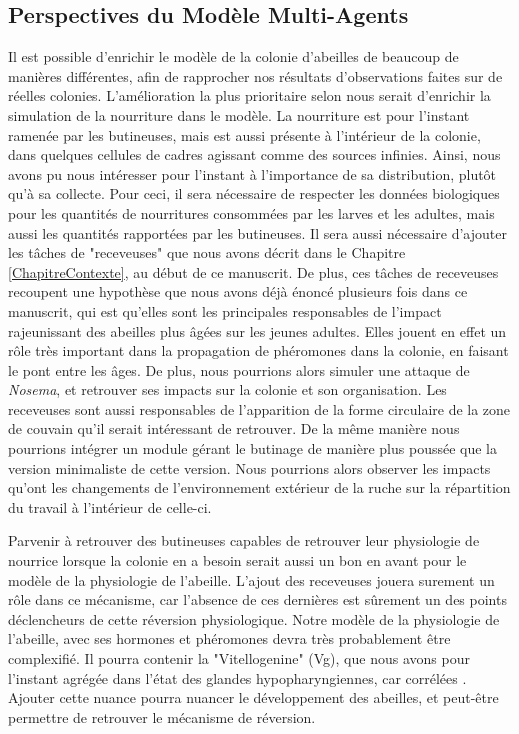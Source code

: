 	\subsection{Perspectives du Modèle Multi-Agents}
	Il est possible d'enrichir le modèle de la colonie d'abeilles de beaucoup de manières différentes, afin de rapprocher nos résultats d'observations faites sur de réelles colonies. L'amélioration la plus prioritaire selon nous serait d'enrichir la simulation de la nourriture dans le modèle. La nourriture est pour l'instant ramenée par les butineuses, mais est aussi présente à l'intérieur de la colonie, dans quelques cellules de cadres agissant comme des sources infinies. Ainsi, nous avons pu nous intéresser pour l'instant à l'importance de sa distribution, plutôt qu'à sa collecte. Pour ceci, il sera nécessaire de respecter les données biologiques pour les quantités de nourritures consommées par les larves et les adultes, mais aussi les quantités rapportées par les butineuses. Il sera aussi nécessaire d'ajouter les tâches de "receveuses" que nous avons décrit dans le Chapitre \ref{ChapitreContexte}, au début de ce manuscrit. De plus, ces tâches de receveuses recoupent une hypothèse que nous avons déjà énoncé plusieurs fois dans ce manuscrit, qui est qu'elles sont les principales responsables de l'impact rajeunissant des abeilles plus âgées sur les jeunes adultes. Elles jouent en effet un rôle très important dans la propagation de phéromones dans la colonie, en faisant le pont entre les âges. De plus, nous pourrions alors simuler une attaque de \textit{Nosema}, et retrouver ses impacts sur la colonie et son organisation. Les receveuses sont aussi responsables de l'apparition de la forme circulaire de la zone de couvain \cite{camazine_self-organizing_1991} qu'il serait intéressant de retrouver. De la même manière nous pourrions intégrer un module gérant le butinage de manière plus poussée que la version minimaliste de cette version. Nous pourrions alors observer les impacts qu'ont les changements de l'environnement extérieur de la ruche sur la répartition du travail à l'intérieur de celle-ci.
	
	Parvenir à retrouver des butineuses capables de retrouver leur physiologie de nourrice lorsque la colonie en a besoin serait aussi un bon en avant pour le modèle de la physiologie de l'abeille. L'ajout des receveuses jouera surement un rôle dans ce mécanisme, car l'absence de ces dernières est sûrement un des points déclencheurs de cette réversion physiologique. Notre modèle de la physiologie de l'abeille, avec ses hormones et phéromones devra très probablement être complexifié. Il pourra contenir la "Vitellogenine" (Vg), que nous avons pour l'instant agrégée dans l'état des glandes hypopharyngiennes, car corrélées \cite{johnson_division_2010}. Ajouter cette nuance pourra nuancer le développement des abeilles, et peut-être permettre de retrouver le mécanisme de réversion.
	
